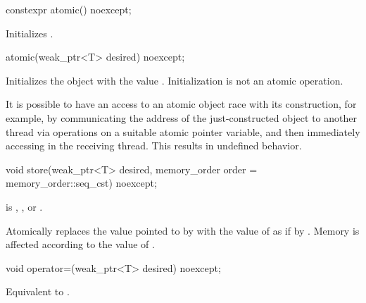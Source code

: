 %
\begin{itemdecl}
constexpr atomic() noexcept;
\end{itemdecl}

\begin{itemdescr}
\pnum
\effects
Initializes .
\end{itemdescr}

%
\begin{itemdecl}
atomic(weak_ptr<T> desired) noexcept;
\end{itemdecl}

\begin{itemdescr}
\pnum
\effects
Initializes the object with the value .
Initialization is not an atomic operation.
\begin{note}
It is possible to have an access to
an atomic object  race with its construction,
for example,
by communicating the address of the just-constructed object 
to another thread via  operations
on a suitable atomic pointer variable, and
then immediately accessing  in the receiving thread.
This results in undefined behavior.
\end{note}
\end{itemdescr}

%
\begin{itemdecl}
void store(weak_ptr<T> desired, memory_order order = memory_order::seq_cst) noexcept;
\end{itemdecl}

\begin{itemdescr}
\pnum
\expects
{} is
,
, or
.

\pnum
\effects
Atomically replaces the value pointed to by  with
the value of  as if by .
Memory is affected according to the value of .
\end{itemdescr}

%
\begin{itemdecl}
void operator=(weak_ptr<T> desired) noexcept;
\end{itemdecl}

\begin{itemdescr}
\pnum
\effects
Equivalent to .
\end{itemdescr}

